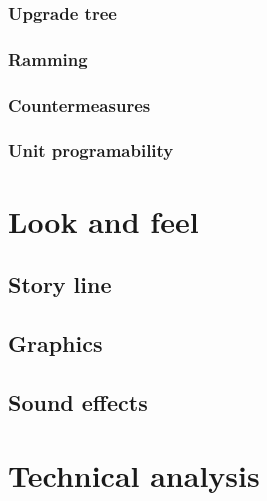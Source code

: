 \documentclass{article}[10pt]
\begin{document}
\subsubsection{Upgrade tree}
\paragraph{}

\subsubsection{Ramming}
\paragraph{}

\subsubsection{Countermeasures}
\paragraph{}

\subsubsection{Unit programability}
\paragraph{}

\section{Look and feel}
\subsection{Story line}
\subsection{Graphics}
\subsection{Sound effects}
\pagebreak

\section{Technical analysis}
\end{document}
